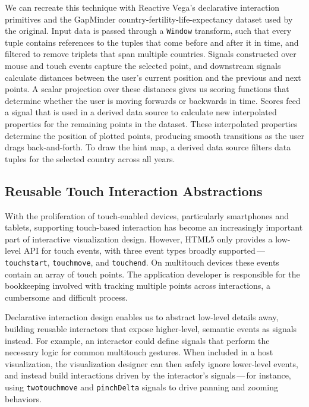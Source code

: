 We can recreate this technique with Reactive Vega's declarative interaction
primitives and the GapMinder country-fertility-life-expectancy dataset used by
the original. Input data is passed through a \texttt{Window} transform, such
that every tuple contains references to the tuples that come before and after it
in time, and filtered to remove triplets that span multiple countries. Signals
constructed over mouse and touch events capture the selected point, and
downstream signals calculate distances between the user's current position and
the previous and next points. A scalar projection over these distances gives us
scoring functions that determine whether the user is moving forwards or
backwards in time. Scores feed a signal that is used in a derived data source to
calculate new interpolated properties for the remaining points in the dataset.
These interpolated properties determine the position of plotted points,
producing smooth transitions as the user drags back-and-forth. To draw the hint
map, a derived data source filters data tuples for the selected country across
all years.

\subsection{Reusable Touch Interaction Abstractions}

With the proliferation of touch-enabled devices, particularly smartphones and
tablets, supporting touch-based interaction has become an increasingly important
part of interactive visualization design. However, HTML5 only provides a
low-level API for touch events, with three event types broadly
supported\,---\,\texttt{touchstart}, \texttt{touchmove}, and \texttt{touchend}.
On multitouch devices these events contain an array of touch points. The
application developer is responsible for the bookkeeping involved with tracking
multiple points across interactions, a cumbersome and difficult process.

Declarative interaction design enables us to abstract low-level details away,
building reusable interactors that expose higher-level, semantic events as
signals instead. For example, an interactor could define signals that perform
the necessary logic for common multitouch gestures. When included in a host
visualization, the visualization designer can then safely ignore lower-level
events, and instead build interactions driven by the interactor's
signals\,---\,for instance, using \texttt{twotouchmove} and \texttt{pinchDelta}
signals to drive panning and zooming behaviors.